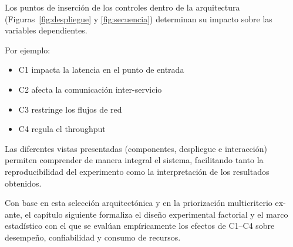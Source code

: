 Los puntos de inserción de los controles dentro de la arquitectura (Figuras~\ref{fig:despliegue} y \ref{fig:secuencia}) determinan su impacto sobre las variables dependientes.

Por ejemplo:

\begin{itemize}
    \item C1 impacta la latencia en el punto de entrada
    \item C2 afecta la comunicación inter-servicio
    \item C3 restringe los flujos de red
    \item C4 regula el throughput
\end{itemize}

Las diferentes vistas presentadas (componentes, despliegue e interacción) permiten comprender de manera integral el sistema, facilitando tanto la reproducibilidad del experimento como la interpretación de los resultados obtenidos.

Con base en esta selección arquitectónica y en la priorización multicriterio ex-ante, el capítulo siguiente formaliza el diseño experimental factorial y el marco estadístico con el que se evalúan empíricamente los efectos de C1--C4 sobre desempeño, confiabilidad y consumo de recursos.


